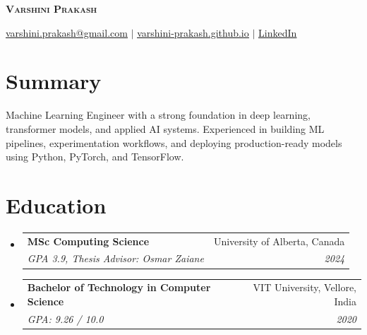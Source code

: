 \documentclass[letterpaper,11pt]{article}
\makeatletter
\newcommand{\resumeSubheading}[4]{
  \vspace{-2pt}\item
    \begin{tabular*}{0.97\textwidth}[t]{l@{\extracolsep{\fill}}r}
      \textbf{#1} & #2 \\
      \textit{\small#3} & \textit{\small #4} \\
    \end{tabular*}\vspace{-7pt}
}
\newcommand{\resumeSubHeadingListStart}{\begin{itemize}[leftmargin=0.15in, label={}]}
\newcommand{\resumeSubHeadingListEnd}{\end{itemize}}
\makeatother
\begin{document}
\begin{center}
    \textbf{\LARGE \scshape Varshini Prakash}
\end{center}

\begin{center}
    

\href{mailto:varshini.prakash@gmail.com}{\uline{varshini.prakash@gmail.com}} $|$
\href{https://varshini-prakash.github.io}{\uline{varshini-prakash.github.io}} $|$ \href{https://www.linkedin.com/in/varshini-prakash/}{\uline{LinkedIn}} 
\end{center}

\section{Summary}
\begin{justify}
Machine Learning Engineer with a strong foundation in deep learning, transformer models, and applied AI systems. Experienced in building ML pipelines, experimentation workflows, and deploying production-ready models using Python, PyTorch, and TensorFlow.
\end{justify}

\section{Education}
  \resumeSubHeadingListStart
    \resumeSubheading
      {MSc Computing Science}{University of Alberta, Canada}
      {GPA 3.9, Thesis Advisor: Osmar Zaiane}{2024}
      \resumeSubheading
      {Bachelor of Technology in Computer Science}{VIT University, Vellore, India}{GPA: 9.26 / 10.0}{2020}
  \resumeSubHeadingListEnd

\end{document}
